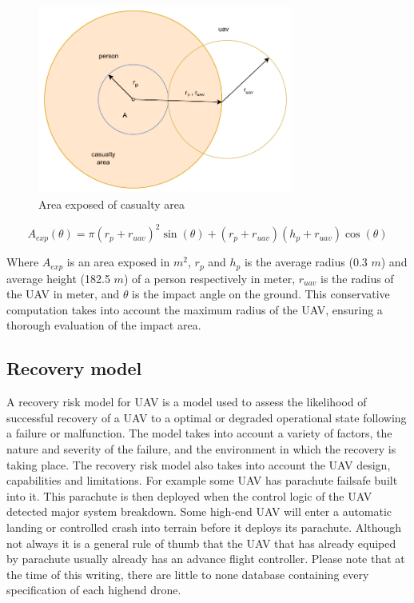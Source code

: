 \documentclass[12pt]{report}
\begin{document}
            \begin{figure}[H]
                \centering
                \includegraphics[width=0.75\textwidth]{General Image/OSM Drone-Area Exposed.pdf}
                \caption{Area exposed of casualty area}
            \end{figure}

            \begin{equation}
                A_{exp}(\theta) = \pi (r_p + r_{uav})^2 \sin (\theta) + (r_p + r_{uav})(h_p + r_{uav}) \cos (\theta)
            \end{equation}

            Where \(A_{exp}\) is an area exposed in \(m^2 \), $r_p$ and \(h_p\) is the average radius (0.3 \(m\)) and
            average height (182.5 \(m\)) of a person respectively in meter, $r_{uav}$ is the radius of the UAV in meter,
            and $\theta$ is the impact angle on the ground. This conservative computation takes into account the maximum
            radius of the UAV, ensuring a thorough evaluation of the impact area.

        \subsection{Recovery model}
            A recovery risk model for UAV is a model used to assess the likelihood of successful recovery of a UAV to a
            optimal or degraded operational state following a failure or malfunction. The model takes into account a
            variety of factors, the nature and severity of the failure, and the environment in which the recovery is
            taking place. The recovery risk model also takes into account the UAV design, capabilities and limitations.
            For example some UAV has parachute failsafe built into it. This parachute is then deployed when the control
            logic of the UAV detected major system breakdown. Some high-end UAV will enter a automatic landing or
            controlled crash into terrain before it deploys its parachute. Although not always it is a general rule of
            thumb that the UAV that has already equiped by parachute usually already has an advance flight controller.
            Please note that at the time of this writing, there are little to none database containing every specification
            of each highend drone.
                
\end{document}
